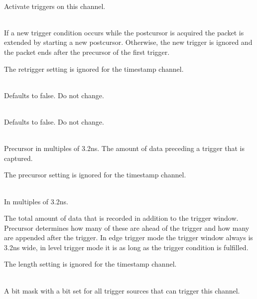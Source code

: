         \\
        Activate triggers on this channel.\par

        \\
        If a new trigger condition occurs while the postcursor is acquired the packet is extended by starting a new postcursor. Otherwise, the new trigger is ignored and the packet ends after the precursor of the first trigger.\par

        The retrigger setting is ignored for the timestamp channel.\par

        \\
        Defaults to false. Do not change.\par

        \\
        Defaults to false. Do not change.\par

        \\
        Precursor in multiples of 3.2ns. The amount of data preceding a trigger that is captured.\par

        The precursor setting is ignored for the timestamp channel.\par

        \\
        In multiples of 3.2ns.\par

        The total amount of data that is recorded in addition to the trigger window. Precursor determines how many of these are ahead of the trigger and how many are appended after the trigger. In edge trigger mode the trigger window always is 3.2ns wide, in level trigger mode it is as long as the
trigger condition is fulfilled.\par

        The length setting is ignored for the timestamp channel.\par

        \\
        A bit mask with a bit set for all trigger sources that can trigger this channel.\par

